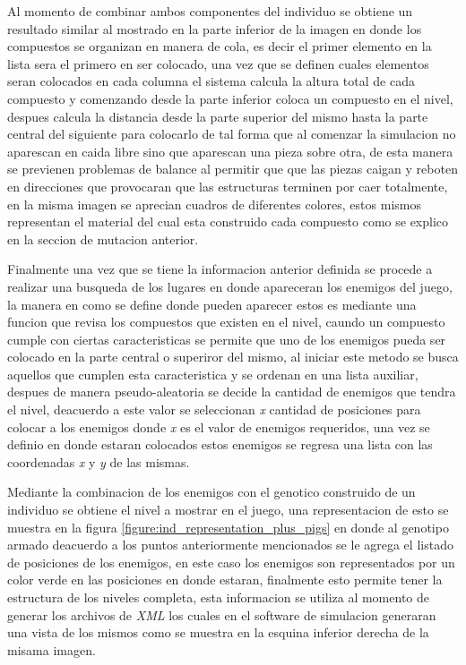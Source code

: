Al momento de combinar ambos componentes del individuo se obtiene un resultado
similar al mostrado en la parte inferior de la imagen en donde los compuestos se
organizan en manera de cola, es decir el primer elemento en la lista sera el
primero en ser colocado, una vez que se definen cuales elementos seran colocados
en cada columna el sistema calcula la altura total de cada compuesto y
comenzando desde la parte inferior coloca un compuesto en el nivel, despues
calcula la distancia desde la parte superior del mismo hasta la parte central
del siguiente para colocarlo de tal forma que al comenzar la simulacion no
aparescan en caida libre sino que aparescan una pieza sobre otra, de esta manera
se previenen problemas de balance al permitir que que las piezas caigan y
reboten en direcciones que provocaran que las estructuras terminen por caer
totalmente, en la misma imagen se aprecian cuadros de diferentes colores, estos
mismos representan el material del cual esta construido cada compuesto como se
explico en la seccion de mutacion anterior.

Finalmente una vez que se tiene la informacion anterior definida se procede a
realizar una busqueda de los lugares en donde apareceran los enemigos del juego,
la manera en como se define donde pueden aparecer estos es mediante una funcion
que revisa los compuestos que existen en el nivel, caundo un compuesto cumple
con ciertas caracteristicas se permite que uno de los enemigos pueda ser
colocado en la parte central o superiror del mismo, al iniciar este metodo se
busca aquellos que cumplen esta caracteristica y se ordenan en una lista
auxiliar, despues de manera pseudo-aleatoria se decide la cantidad de enemigos
que tendra el nivel, deacuerdo a este valor se seleccionan \textit{x} cantidad
de posiciones para colocar a los enemigos donde \textit{x} es el valor de
enemigos requeridos, una vez se definio en donde estaran colocados estos
enemigos se regresa una lista con las coordenadas \textit{x} y \textit{y} de las
mismas.

Mediante la combinacion de los enemigos con el genotico construido de un
individuo se obtiene el nivel a mostrar en el juego, una representacion de esto
se muestra en la figura \ref{figure:ind_representation_plus_pigs} en donde al
genotipo armado deacuerdo a los puntos anteriormente mencionados se le agrega el
listado de posiciones de los enemigos, en este caso los enemigos son
representados por un color verde en las posiciones en donde estaran, finalmente
esto permite tener la estructura de los niveles completa, esta informacion se
utiliza al momento de generar los archivos de \textit{XML} los cuales en el
software de simulacion generaran una vista de los mismos como se muestra en la
esquina inferior derecha de la misama imagen. 

